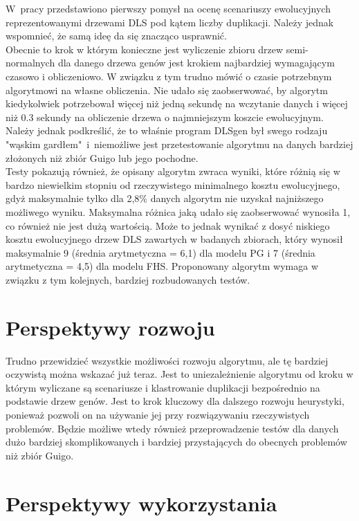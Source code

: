 \documentclass[licencjacka]{pracamgr}
\begin{document}
W~pracy przedstawiono pierwszy pomysł na ocenę scenariuszy ewolucyjnych reprezentowanymi drzewami DLS pod kątem liczby duplikacji. Należy jednak wspomnieć, że samą ideę da się znacząco usprawnić. 
\\
Obecnie to krok w którym konieczne jest wyliczenie zbioru drzew semi-normalnych dla danego drzewa genów jest krokiem najbardziej wymagającym czasowo i obliczeniowo.  W związku z tym trudno mówić o czasie potrzebnym algorytmowi na własne obliczenia. Nie udało się zaobserwować, by algorytm kiedykolwiek potrzebował więcej niż jedną sekundę na wczytanie danych i więcej niż 0.3 sekundy na obliczenie drzewa o najmniejszym koszcie ewolucyjnym. Należy jednak podkreślić, że to właśnie program DLSgen był swego rodzaju "wąskim gardłem"~i~niemożliwe jest przetestowanie algorytmu na danych bardziej złożonych niż zbiór Guigo lub jego pochodne. 
\\
Testy pokazują również, że opisany algorytm zwraca wyniki, które różnią się w bardzo niewielkim stopniu od rzeczywistego minimalnego kosztu ewolucyjnego, gdyż maksymalnie tylko dla 2,8\% danych algorytm nie uzyskał najniższego możliwego wyniku. Maksymalna różnica jaką udało się zaobserwować wynosiła 1, co również nie jest dużą wartością. Może to jednak wynikać z dosyć niskiego kosztu ewolucyjnego drzew DLS zawartych w badanych zbiorach, który wynosił maksymalnie 9 (średnia arytmetyczna = 6,1) dla modelu PG i 7 (średnia arytmetyczna = 4,5) dla modelu FHS. Proponowany algorytm wymaga w związku z tym kolejnych, bardziej rozbudowanych testów.


\section{Perspektywy rozwoju}

Trudno przewidzieć wszystkie możliwości rozwoju algorytmu, ale tę bardziej
oczywistą można wskazać już teraz.  Jest to uniezależnienie algorytmu od kroku w którym wyliczane są scenariusze i klastrowanie duplikacji bezpośrednio na podstawie drzew genów. Jest to krok kluczowy dla dalszego rozwoju heurystyki, ponieważ pozwoli on na używanie jej przy rozwiązywaniu rzeczywistych problemów. Będzie możliwe wtedy również przeprowadzenie testów dla danych dużo bardziej skomplikowanych i bardziej przystających do obecnych problemów niż zbiór Guigo.

\section{Perspektywy wykorzystania}
\end{document}
